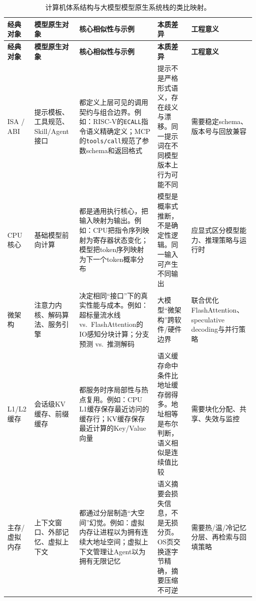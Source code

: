\scriptsize
\renewcommand{\arraystretch}{1.25}
\begin{longtable}{p{}p{}p{}p{}p{}}
\caption{计算机体系结构与大模型模型原生系统栈的类比映射。}\label{tab:mapping}\\
\toprule
\textbf{经典对象} & \textbf{模型原生对象} & \textbf{核心相似性与示例} & \textbf{本质差异} & \textbf{工程意义} \\
\midrule
\endfirsthead
\toprule
\textbf{经典对象} & \textbf{模型原生对象} & \textbf{核心相似性与示例} & \textbf{本质差异} & \textbf{工程意义} \\
\midrule
\endhead

ISA / ABI & 提示模板、工具规范、Skill/Agent接口 & 都定义上层可见的调用契约与组合边界。例如：RISC-V的\texttt{ECALL}指令语义精确定义\cite{riscv_spec_2026}；MCP的\texttt{tools/call}规范了参数schema和返回格式\cite{mcp_intro_2026} & 提示不是严格形式语义，存在歧义与漂移。同一提示词在不同模型版本上行为可能不同 & 需要稳定schema、版本号与回放兼容 \\[3pt]

CPU核心 & 基础模型前向计算 & 都是通用执行核心，把输入映射为输出。例如：CPU把指令序列映射为寄存器状态变化；模型把token序列映射为下一个token概率分布\cite{vaswani2017attention,brown2020gpt3} & 模型是概率式推断，不是确定性逻辑。同一输入可产生不同输出 & 应显式区分模型能力、推理策略与运行时 \\[3pt]

微架构 & 注意力内核、解码算法、服务引擎 & 决定相同``接口''下的真实性能与成本。例如：超标量流水线 vs.\ FlashAttention的IO感知分块计算\cite{dao2022flashattention}；分支预测 vs.\ 推测解码\cite{leviathan2023speculative} & 大模型``微架构''跨软件/硬件边界 & 联合优化FlashAttention、speculative decoding与并行策略 \\[3pt]

L1/L2缓存 & 会话级KV缓存、前缀缓存 & 都服务时序局部性与热点复用。例如：CPU L1缓存保存最近访问的缓存行；KV缓存保存最近计算的Key/Value向量\cite{kwon2023pagedattention,vllm_prefix_2026} & 语义缓存命中条件比地址缓存弱得多。地址相等是布尔判断，语义相似是连续值比较 & 需要块化分配、共享、失效与监控 \\[3pt]

主存/虚拟内存 & 上下文窗口、外部记忆、虚拟上下文 & 都通过分层制造``大空间''幻觉。例如：虚拟内存让进程以为拥有连续大地址空间；虚拟上下文管理让Agent以为拥有无限记忆\cite{memgpt2023} & 语义摘要会损失信息，不是无损分页。OS页交换逐字节精确，摘要压缩不可逆 & 需要热/温/冷记忆分层、再检索与回填策略 \\[3pt]


\end{longtable}
